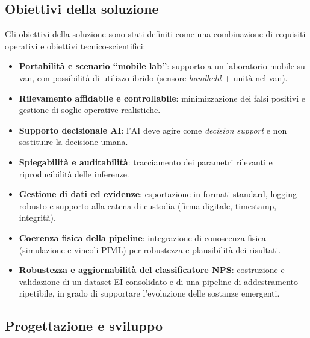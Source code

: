 \subsection{Obiettivi della soluzione}
\label{subsec:solution_objectives}

Gli obiettivi della soluzione sono stati definiti come una combinazione di requisiti operativi e obiettivi tecnico-scientifici:

\begin{itemize}
    \item \textbf{Portabilità e scenario ``mobile lab''}: supporto a un laboratorio mobile su van, con possibilità di utilizzo ibrido (sensore \textit{handheld} + unità nel van).
    \item \textbf{Rilevamento affidabile e controllabile}: minimizzazione dei falsi positivi e gestione di soglie operative realistiche.
    \item \textbf{Supporto decisionale AI}: l'AI deve agire come \emph{decision support} e non sostituire la decisione umana.
    \item \textbf{Spiegabilità e auditabilità}: tracciamento dei parametri rilevanti e riproducibilità delle inferenze.
    \item \textbf{Gestione di dati ed evidenze}: esportazione in formati standard, logging robusto e supporto alla catena di custodia (firma digitale, timestamp, integrità).
    \item \textbf{Coerenza fisica della pipeline}: integrazione di conoscenza fisica (simulazione e vincoli PIML) per robustezza e plausibilità dei risultati.
    \item \textbf{Robustezza e aggiornabilità del classificatore NPS}: costruzione e validazione di un dataset EI consolidato e di una pipeline di addestramento ripetibile, in grado di supportare l’evoluzione delle sostanze emergenti.
\end{itemize}

\subsection{Progettazione e sviluppo}
\label{subsec:design_development}

